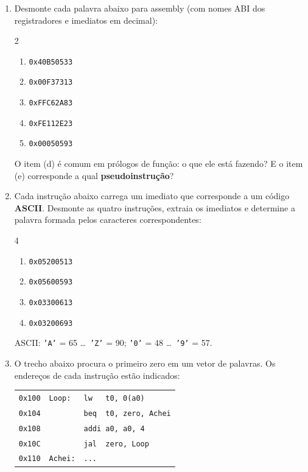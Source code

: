 \documentclass[11pt, a4paper]{article}
\begin{document}
\begin{enumerate}
\item Desmonte cada palavra abaixo para assembly (com nomes ABI dos registradores e imediatos em decimal):
\begin{multicols}{2}
\begin{enumerate}
  \item \texttt{0x40B50533}
  \item \texttt{0x00F37313}
  \item \texttt{0xFFC62A83}
  \item \texttt{0xFE112E23}
  \item \texttt{0x00050593}
\end{enumerate}
\end{multicols}
O item (d) \'{e} comum em pr\'{o}logos de fun\c{c}\~{a}o: o que ele est\'{a} fazendo? E o item (e) corresponde a qual \textbf{pseudoinstru\c{c}\~{a}o}?

\item Cada instru\c{c}\~{a}o abaixo carrega um imediato que corresponde a um c\'{o}digo \textbf{ASCII}. Desmonte as quatro instru\c{c}\~{o}es, extraia os imediatos e determine a palavra formada pelos caracteres correspondentes:
\begin{multicols}{4}
\begin{enumerate}
  \item \texttt{0x05200513}
  \item \texttt{0x05600593}
  \item \texttt{0x03300613}
  \item \texttt{0x03200693}
\end{enumerate}
\end{multicols}
\begin{dica}
ASCII: \texttt{'A'} = 65 \ldots\ \texttt{'Z'} = 90; \quad \texttt{'0'} = 48 \ldots\ \texttt{'9'} = 57.
\end{dica}

\item O trecho abaixo procura o primeiro zero em um vetor de palavras. Os endere\c{c}os de cada instru\c{c}\~{a}o est\~{a}o indicados:

\begin{center}
\small
\begin{tabular}{rll}
\texttt{0x100} & \texttt{Loop:} & \texttt{lw \ \ t0, 0(a0)}\\
\texttt{0x104} & & \texttt{beq \ t0, zero, Achei}\\
\texttt{0x108} & & \texttt{addi a0, a0, 4}\\
\texttt{0x10C} & & \texttt{jal \ zero, Loop}\\
\texttt{0x110} & \texttt{Achei:} & \texttt{...}\\
\end{tabular}
\end{center}


\end{enumerate}
\end{document}
